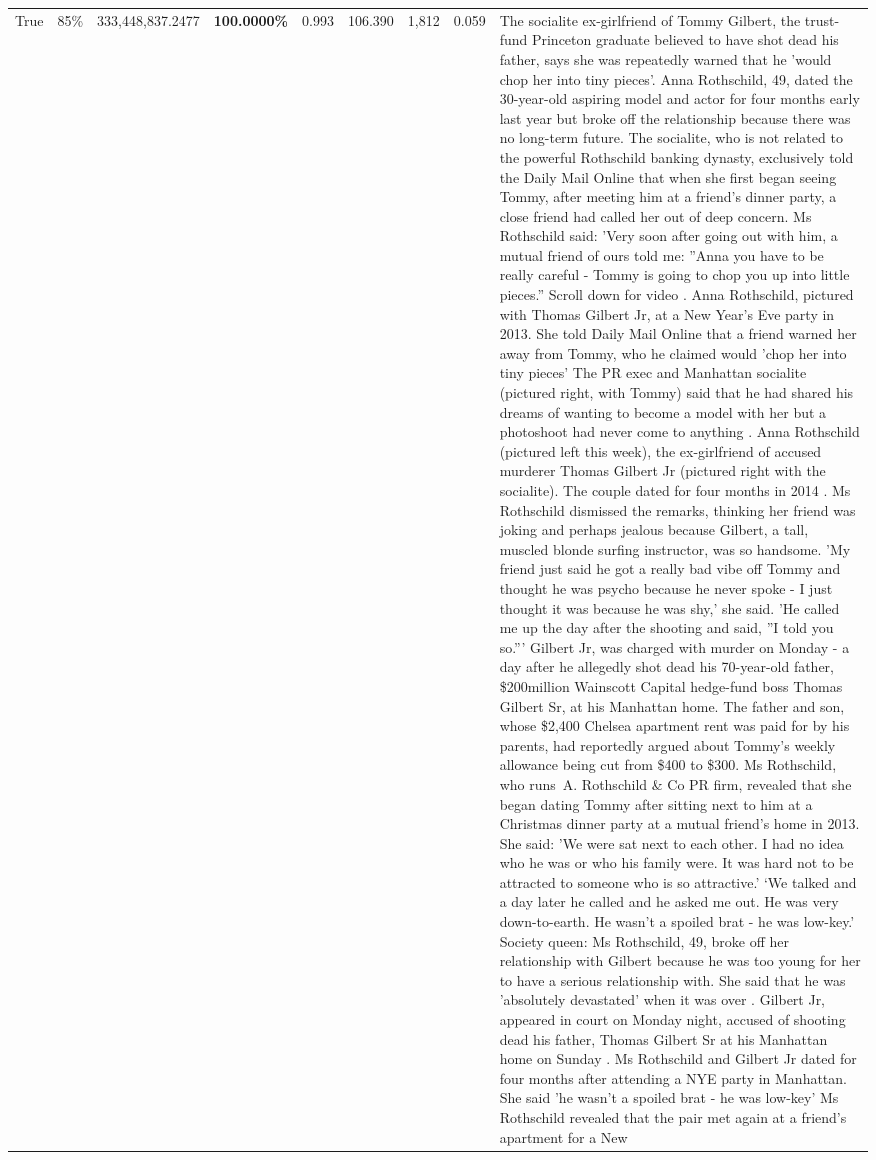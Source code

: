 \begin{table}[H]
\begin{tabular}{lllrlllll}
True & 85\% & 333,448,837.2477 & \bfseries \color{red} 100.0000\% & 0.993 & 106.390 & 1,812 & 0.059 & The socialite ex-girlfriend of Tommy Gilbert, the trust-fund Princeton graduate believed to have shot dead his father, says she was repeatedly warned that he 'would chop her into tiny pieces'. Anna Rothschild, 49, dated the 30-year-old aspiring model and actor for four months early last year but broke off the relationship because there was no long-term future. The socialite, who is not related to the powerful Rothschild banking dynasty, exclusively told the Daily Mail Online that when she first began seeing Tommy, after meeting him at a friend's dinner party, a close friend had called her out of deep concern. Ms Rothschild said: 'Very soon after going out with him, a mutual friend of ours told me: ''Anna you have to be really careful - Tommy is going to chop you up into little pieces.'' Scroll down for video . Anna Rothschild, pictured with Thomas Gilbert Jr, at a New Year's Eve party in 2013. She told Daily Mail Online that a friend warned her away from Tommy, who he claimed would 'chop her into tiny pieces' The PR exec and Manhattan socialite (pictured right, with Tommy) said that he had shared his dreams of wanting to become a model with her but a photoshoot had never come to anything . Anna Rothschild (pictured left this week), the ex-girlfriend of accused murderer Thomas Gilbert Jr (pictured right with the socialite). The couple dated for four months in 2014 . Ms Rothschild dismissed the remarks, thinking her friend was joking and perhaps jealous because Gilbert, a tall, muscled blonde surfing instructor, was so handsome. 'My friend just said he got a really bad vibe off Tommy and thought he was psycho because he never spoke - I just thought it was because he was shy,' she said. 'He called me up the day after the shooting and said, ''I told you so.''' Gilbert Jr, was charged with murder on Monday - a day after he allegedly shot dead his 70-year-old father, \$200million Wainscott Capital hedge-fund boss Thomas Gilbert Sr, at his Manhattan home. The father and son, whose \$2,400 Chelsea apartment rent was paid for by his parents, had reportedly argued about Tommy's weekly allowance being cut from \$400 to \$300. Ms Rothschild, who runs A. Rothschild \& Co PR firm, revealed that she began dating Tommy after sitting next to him at a Christmas dinner party at a mutual friend's home in 2013. She said: 'We were sat next to each other. I had no idea who he was or who his family were. It was hard not to be attracted to someone who is so attractive.' ‘We talked and a day later he called and he asked me out. He was very down-to-earth. He wasn’t a spoiled brat - he was low-key.’ Society queen: Ms Rothschild, 49, broke off her relationship with Gilbert because he was too young for her to have a serious relationship with. She said that he was 'absolutely devastated' when it was over . Gilbert Jr, appeared in court on Monday night, accused of shooting dead his father, Thomas Gilbert Sr at his Manhattan home on Sunday . Ms Rothschild and Gilbert Jr dated for four months after attending a NYE party in Manhattan. She said 'he wasn't a spoiled brat - he was low-key' Ms Rothschild revealed that the pair met again at a friend’s apartment for a New 
\end{tabular}
\end{table}
